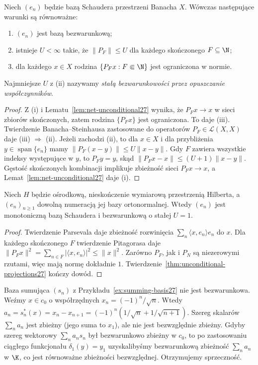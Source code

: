 \begin{twierdzenie}
\label{thm:unconditional-projections27}
Niech $(e_n)$ będzie bazą Schaudera przestrzeni Banacha $X$.
Wówczas następujące warunki są równoważne:
\begin{enumerate}[label=\textup{(\roman*)}]
\item $(e_n)$ jest bazą bezwarunkową;
\item istnieje $U<\infty$ takie, że $\|P_F\|\le U$
 dla każdego skończonego $F\subseteq\N$;
\item dla każdego $x\in X$ rodzina
$\{P_Fx:F\Subset\N\}$ jest ograniczona w normie.
\end{enumerate}
Najmniejsze $U$ z (ii) nazywamy \emph{stałą bezwarunkowości
przez opuszczanie współczynników}.
\end{twierdzenie}
\begin{proof}
Z (i) i Lematu~\ref{lem:net-unconditional27} wynika, że
$P_Fx\to x$ w sieci zbiorów skończonych, zatem rodzina
$\{P_Fx\}$ jest ograniczona. To daje (iii).
Twierdzenie Banacha--Steinhausa zastosowane do operatorów
$P_F\in\mathcal L(X,X)$ daje (iii) $\Rightarrow$ (ii).
Jeżeli zachodzi (ii), to dla $x\in X$ i dla przybliżenia
$y\in\operatorname{span}\{e_n\}$ mamy
$\|P_F(x-y)\|\le U\|x-y\|$.
Gdy $F$ zawiera wszystkie indeksy występujące w $y$,
to $P_Fy=y$, skąd $\|P_Fx-x\|\le(U+1)\|x-y\|$.
Gęstość skończonych kombinacji implikuje zbieżność
sieci $P_Fx\to x$, a Lemat~\ref{lem:net-unconditional27}
daje (i).
\end{proof}

\begin{wniosek}
\label{cor:hilbert-unconditional27}
Niech $H$ będzie ośrodkową, nieskończenie wymiarową
przestrzenią Hilberta, a $(e_n)_{n\ge1}$ dowolną numeracją
jej bazy ortonormalnej. Wtedy $(e_n)$ jest monotoniczną
bazą Schaudera i bezwarunkową o stałej $U=1$.
\end{wniosek}
\begin{proof}
Twierdzenie Parsevala daje zbieżność rozwinięcia
$\sum_n\langle x,e_n\rangle e_n$ do $x$.
Dla każdego skończonego $F$ twierdzenie Pitagorasa
daje $\|P_Fx\|^2=\sum_{n\in F}|\langle x,e_n\rangle|^2
\le\|x\|^2$. Zarówno $P_F$, jak i $P_N$ są
niezerowymi rzutami, więc mają normę dokładnie $1$.
Twierdzenie~\ref{thm:unconditional-projections27} kończy dowód.
\end{proof}

\begin{przyklad}
\label{ex:conditional-summing27}
Baza sumująca $(s_n)$ z Przykładu~\ref{ex:summing-basis27}
nie jest bezwarunkowa. Weźmy $x\in c_0$ o współrzędnych
$x_n=(-1)^n/\sqrt n$. Wtedy
$a_n=s_n^*(x)=x_n-x_{n+1}=(-1)^n(1/\sqrt n+1/\sqrt{n+1})$.
Szereg skalarów $\sum_n a_n$ jest zbieżny (jego suma to
$x_1$), ale nie jest bezwzględnie zbieżny.
Gdyby szereg wektorowy $\sum_n a_ns_n$ był bezwarunkowo
zbieżny w $c_0$, to po zastosowaniu ciągłego
funkcjonału $\delta_1(y)=y_1$ uzyskalibyśmy bezwarunkową
zbieżność $\sum_n a_n$ w $\K$, co jest równoważne
zbieżności bezwzględnej. Otrzymujemy sprzeczność.
\end{przyklad}

